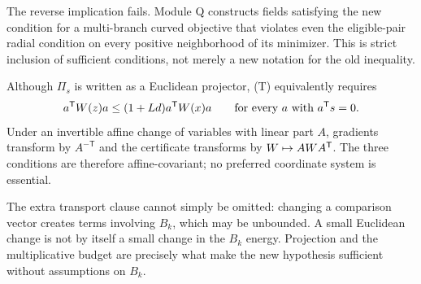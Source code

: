 The reverse implication fails. Module Q constructs fields satisfying the new condition for a multi-branch curved objective that violates even the eligible-pair radial condition on every positive neighborhood of its minimizer. This is strict inclusion of sufficient conditions, not merely a new notation for the old inequality.

Although $\Pi_s$ is written as a Euclidean projector, (T) equivalently requires
\[
 a^{\mathsf T} W(z)a\le(1+Ld)a^{\mathsf T} W(x)a\qquad\text{for every }a\text{ with }a^{\mathsf T} s=0.
\]
Under an invertible affine change of variables with linear part $A$, gradients transform by $A^{-\mathsf T}$ and the certificate transforms by $W\mapsto AWA^{\mathsf T}$. The three conditions are therefore affine-covariant; no preferred coordinate system is essential.

The extra transport clause cannot simply be omitted: changing a comparison vector creates terms involving $B_k$, which may be unbounded. A small Euclidean change is not by itself a small change in the $B_k$ energy. Projection and the multiplicative budget are precisely what make the new hypothesis sufficient without assumptions on $B_k$.


\endgroup
